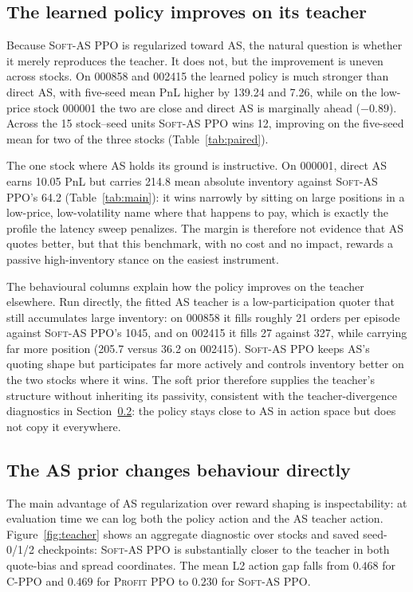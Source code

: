 \documentclass{article}
\newcommand{\softas}{\textsc{Soft-AS PPO}}
\newcommand{\cppo}{\textsc{C-PPO}}
\newcommand{\profitppo}{\textsc{Profit PPO}}
\begin{document}
\subsection{The learned policy improves on its teacher}
\label{sec:teacher}


Because \softas{} is regularized toward AS, the natural question is whether it merely reproduces the teacher. It does not, but the improvement is uneven across stocks. On 000858 and 002415 the learned policy is much stronger than direct AS, with five-seed mean PnL higher by 139.24 and 7.26, while on the low-price stock 000001 the two are close and direct AS is marginally ahead ($-0.89$). Across the 15 stock--seed units \softas{} wins 12, improving on the five-seed mean for two of the three stocks (Table~\ref{tab:paired}).

The one stock where AS holds its ground is instructive. On 000001, direct AS earns 10.05 PnL but carries 214.8 mean absolute inventory against \softas{}'s 64.2 (Table~\ref{tab:main}): it wins narrowly by sitting on large positions in a low-price, low-volatility name where that happens to pay, which is exactly the profile the latency sweep penalizes. The margin is therefore not evidence that AS quotes better, but that this benchmark, with no cost and no impact, rewards a passive high-inventory stance on the easiest instrument.

The behavioural columns explain how the policy improves on the teacher elsewhere. Run directly, the fitted AS teacher is a low-participation quoter that still accumulates large inventory: on 000858 it fills roughly 21 orders per episode against \softas{}'s 1045, and on 002415 it fills 27 against 327, while carrying far more position (205.7 versus 36.2 on 002415). \softas{} keeps AS's quoting shape but participates far more actively and controls inventory better on the two stocks where it wins. The soft prior therefore supplies the teacher's structure without inheriting its passivity, consistent with the teacher-divergence diagnostics in Section~\ref{sec:res-behaviour}: the policy stays close to AS in action space but does not copy it everywhere.

\subsection{The AS prior changes behaviour directly}
\label{sec:res-behaviour}

The main advantage of AS regularization over reward shaping is inspectability: at evaluation time we can log both the policy action and the AS teacher action. Figure~\ref{fig:teacher} shows an aggregate diagnostic over stocks and saved seed-0/1/2 checkpoints: \softas{} is substantially closer to the teacher in both quote-bias and spread coordinates. The mean L2 action gap falls from $0.468$ for \cppo{} and $0.469$ for \profitppo{} to $0.230$ for \softas{}.
\end{document}
